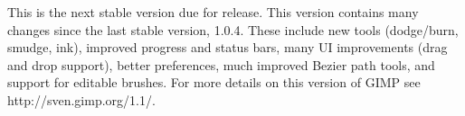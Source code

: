 This is the next stable version due for release.  This version contains many
changes since the last stable version, 1.0.4. These include new tools
(dodge/burn, smudge, ink), improved progress and status bars, many UI 
improvements (drag and drop support), better preferences, much improved Bezier
path tools, and support for editable brushes. For more details on this version
of GIMP see http://sven.gimp.org/1.1/.
